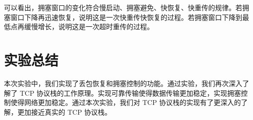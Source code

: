\documentclass[UTF8]{report}
\begin{document}
可以看出，拥塞窗口的变化符合慢启动、拥塞避免、快恢复、快重传的规律。若拥塞窗口下降再迅速恢复，说明这是一次快重传快恢复的过程。若拥塞窗口下降到最低点再缓慢增长，说明这是一次超时重传的过程。

\section{实验总结}

本次实验中，我们实现了丢包恢复和拥塞控制的功能。通过实验，我们再次深入了解了 TCP 协议栈的工作原理。实现可靠传输使得数据传输更加稳定，实现拥塞控制使得网络更加稳定。通过本次实验，我们对 TCP 协议栈的实现有了更深入的了解，更加接近真实的 TCP 协议栈。
\end{document}
